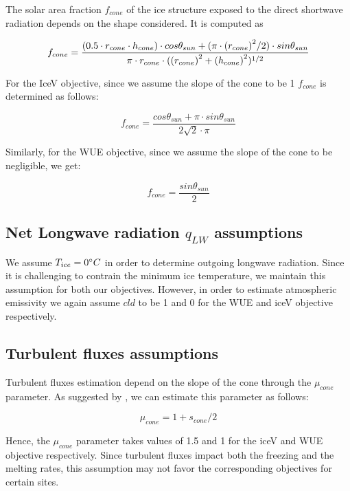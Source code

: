 \documentclass[tc, manuscript]{copernicus}
\begin{document}
The solar area fraction $f_{cone}$ of the ice structure exposed to the direct shortwave radiation depends on the
shape considered. It is computed as

\begin{equation}
		f_{cone} =\frac{(0.5 \cdot r_{cone} \cdot h_{cone}) \cdot cos \theta_{sun} +(\pi \cdot
			{(r_{cone})}^2/2) \cdot sin \theta_{sun} }{\pi \cdot r_{cone} \cdot ({(r_{cone})}^2+{(h_{cone})}^2)^{1/2}}\\
\end{equation}

For the IceV objective, since we assume the slope of the cone to be 1 $f_{cone}$ is determined
as follows:

\begin{equation}
		f_{cone} =\frac{ cos \theta_{sun} + \pi \cdot sin \theta_{sun} }{2\sqrt{2} \cdot \pi }
\end{equation}

Similarly, for the WUE objective, since we assume the slope of the cone to be negligible, we get:

\begin{equation}
		f_{cone} =\frac{ sin \theta_{sun} }{2 }
\end{equation}


\subsection{Net Longwave radiation \texorpdfstring{$q_{LW}$}{Lg} assumptions} \label{sec:LW}


We assume $T_{ice} = 0 ^{\circ} C$ in order to determine outgoing longwave radiation. Since it is challenging to
contrain the minimum ice temperature, we maintain this assumption for both our objectives. However, in order to
estimate atmospheric emissivity we again assume $cld$ to be 1 and 0 for the WUE and iceV objective respectively.

\subsection{Turbulent fluxes assumptions} \label{sec:Qs}

Turbulent fluxes estimation depend on the slope of the cone through the $\mu_{cone}$ parameter. As suggested 
by \citet{oerlemansBriefCommunicationGrowth2021}, we can estimate this parameter as follows:

\begin{equation}
  \mu_{cone} =1 + s_{cone}/2
\end{equation}

Hence, the $\mu_{cone}$ parameter takes values of 1.5 and 1 for the iceV and WUE objective respectively.  Since
turbulent fluxes impact both the freezing and the melting rates, this assumption may not favor the corresponding
objectives for certain sites.

\noappendix       %



\end{document}
